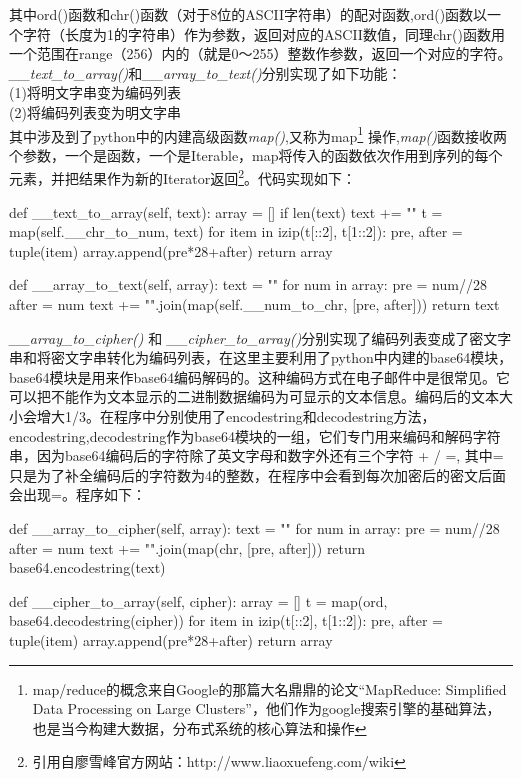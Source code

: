\documentclass[UTF8,nofonts,cs4size]{ctexrep}
\begin{document}
\indent 其中ord()函数和chr()函数（对于8位的ASCII字符串）的配对函数,ord()函数以一个字符（长度为1的字符串）作为参数，返回对应的ASCII数值，同理chr()函数用一个范围在range（256）内的（就是0～255）整数作参数，返回一个对应的字符。\\
\indent \textit{\_\_text\_to\_array()}和\textit{\_\_array\_to\_text()}分别实现了如下功能：\\
\indent (1)将明文字串变为编码列表\\
\indent (2)将编码列表变为明文字串\\
\indent 其中涉及到了python中的内建高级函数\textit{map()},又称为map\footnote{map/reduce的概念来自Google的那篇大名鼎鼎的论文“MapReduce: Simplified Data Processing on Large Clusters”，他们作为google搜索引擎的基础算法，也是当今构建大数据，分布式系统的核心算法和操作} 操作,\textit{map()}函数接收两个参数，一个是函数，一个是Iterable，map将传入的函数依次作用到序列的每个元素，并把结果作为新的Iterator返回\footnote{引用自廖雪峰官方网站：http://www.liaoxuefeng.com/wiki}。代码实现如下：
\begin{python}
def __text_to_array(self, text):
        array = []
        if len(text)%
            text += "\0"
        t = map(self.__chr_to_num, text)
        for item in izip(t[::2], t[1::2]):
            pre, after = tuple(item)
            array.append(pre*28+after)
        return array

    def __array_to_text(self, array):
        text = ""
        for num in array:
            pre = num//28
            after = num%
            text += "".join(map(self.__num_to_chr, [pre, after]))
        return text
\end{python}

\indent \textit{\_\_array\_to\_cipher()} 和 \textit{\_\_cipher\_to\_array()}分别实现了编码列表变成了密文字串和将密文字串转化为编码列表，在这里主要利用了python中内建的base64模块，base64模块是用来作base64编码解码的。这种编码方式在电子邮件中是很常见。它可以把不能作为文本显示的二进制数据编码为可显示的文本信息。编码后的文本大小会增大1/3。在程序中分别使用了encodestring和decodestring方法，encodestring,decodestring作为base64模块的一组，它们专门用来编码和解码字符串，因为base64编码后的字符除了英文字母和数字外还有三个字符 + / =, 其中=只是为了补全编码后的字符数为4的整数，在程序中会看到每次加密后的密文后面会出现=。程序如下：

\begin{python}
def __array_to_cipher(self, array):
        text = ""
        for num in array:
            pre = num//28
            after = num%
            text += "".join(map(chr, [pre, after]))
        return base64.encodestring(text)

    def __cipher_to_array(self, cipher):
        array = []
        t = map(ord, base64.decodestring(cipher))
        for item in izip(t[::2], t[1::2]):
            pre, after = tuple(item)
            array.append(pre*28+after)
        return array
\end{python}
\end{document}

